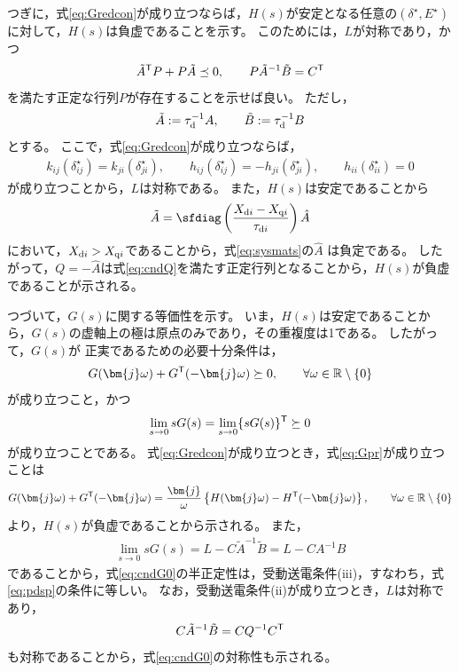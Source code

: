 \documentclass[tombow,dvipdfmx]{corona-a5-1.1}
\begin{document}
\begin{証明}
つぎに，式\ref{eq:Gredcon}が成り立つならば，$H(s)$が安定となる任意の$(\delta^{\star},E^{\star})$に対して，$H(s)$は負虚であることを示す。
このためには，$L$が対称であり，かつ
\begin{align}\label{eq:cndQ}
\tilde{A}^{\sf T}P + P\tilde{A} \preceq 0
,\qquad
P\tilde{A}^{-1}\tilde{B}=C^{\sf T}
\end{align}
を満たす正定な行列$P$が存在することを示せば良い。
ただし，
\begin{align*}
\tilde{A}:= \tau_{\rm d}^{-1}A
,\qquad
\tilde{B}:= \tau_{\rm d}^{-1}B
\end{align*}
とする。
ここで，式\ref{eq:Gredcon}が成り立つならば，
\begin{align*}
k_{ij}(\delta_{ij}^{\star}) =
k_{ji}(\delta_{ji}^{\star})
,\qquad
h_{ij}(\delta_{ij}^{\star}) = 
- h_{ji}(\delta_{ji}^{\star}),\qquad
h_{ii}(\delta_{ii}^{\star}) = 0
\end{align*}
が成り立つことから，$L$は対称である。
また，$H(s)$は安定であることから
\begin{align*}
\tilde{A} = 
\sfdiag \left( \frac{X_{{\rm d}i} -  X_{{\rm q}i}}{\tau_{{\rm d}i}} \right)
\hat{A}
\end{align*}
において，$X_{{\rm d}i} > X_{{\rm q}i}$であることから，式\ref{eq:sysmats}の$\hat{A}$
は負定である。
したがって，$Q=-\hat{A}$は式\ref{eq:cndQ}を満たす正定行列となることから，$H(s)$が負虚であることが示される。


つづいて，$G(s)$に関する等価性を示す。
いま，$H(s)$は安定であることから，$G(s)$の虚軸上の極は原点のみであり，その重複度は1である。
したがって，$G(s)$が
正実であるための必要十分条件は，
\begin{align}\label{eq:Gpr}
G(\bm{j}\omega) + G^{\sf T}(-\bm{j}\omega) \succeq 0
,\qquad \forall \omega \in \mathbb{R}\setminus\{0\}
\end{align}
が成り立つこと，かつ
\begin{align}\label{eq:cndG0}
\lim_{s\rightarrow 0} s G(s) = \lim_{s\rightarrow 0} \{ s G(s)\}^{\sf T}\succeq 0
\end{align}
が成り立つことである。
式\ref{eq:Gredcon}が成り立つとき，式\ref{eq:Gpr}が成り立つことは
\begin{align}\label{eq:NIineq}
G(\bm{j}\omega) + G^{\sf T}(-\bm{j}\omega)
=
\frac{\bm{j}}{\omega} \left\{
H(\bm{j}\omega) - H^{\sf T}(-\bm{j}\omega)
\right\}
,\qquad \forall \omega \in \mathbb{R}\setminus\{0\}
\end{align}
より，$H(s)$が負虚であることから示される。
また，
\begin{align*}
\lim_{s\rightarrow 0} s G(s) =
L - C\tilde{A}^{-1}\tilde{B} = L - C A^{-1} B
\end{align*}
であることから，式\ref{eq:cndG0}の半正定性は，受動送電条件(iii)，すなわち，式\ref{eq:pdsp}の条件に等しい。
なお，受動送電条件(ii)が成り立つとき，$L$は対称であり，
\begin{align*}
C\tilde{A}^{-1}\tilde{B} = C Q^{-1} C^{\sf T}
\end{align*}
も対称であることから，式\ref{eq:cndG0}の対称性も示される。


\end{証明}
\end{document}
